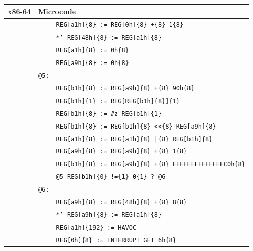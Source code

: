 \documentclass[10pt,twocolumn]{article}
\begin{document}
\begin{table}[!h]
\begin{center}
\begin{tabular}{r|rl}
\textbf{x86-64} & \multicolumn{2}{l}{\textbf{Microcode}}
\\ \hline

& & \texttt{REG[a1h]\{8\} := REG[0h]\{8\} +\{8\} 1\{8\}} \\ & %
& \texttt{*' REG[48h]\{8\} := REG[a1h]\{8\}} \\ & %
& \texttt{REG[a1h]\{8\} := 0h\{8\}} \\ & %
& \texttt{REG[a9h]\{8\} := 0h\{8\}} \\ & %
\texttt{@5:} \\ & %
& \texttt{REG[b1h]\{8\} := REG[a9h]\{8\} +\{8\} 90h\{8\}} \\ & %
& \texttt{REG[b1h]\{1\} := REG[REG[b1h]\{8\}]\{1\}} \\ & %
& \texttt{REG[b1h]\{8\} := \#z REG[b1h]\{1\}} \\ & %
& \texttt{REG[b1h]\{8\} := REG[b1h]\{8\} <<\{8\} REG[a9h]\{8\}} \\ & %
& \texttt{REG[a1h]\{8\} := REG[a1h]\{8\} |\{8\} REG[b1h]\{8\}} \\ & %
& \texttt{REG[a9h]\{8\} := REG[a9h]\{8\} +\{8\} 1\{8\}} \\ & %
& \texttt{REG[b1h]\{8\} := REG[a9h]\{8\} +\{8\} FFFFFFFFFFFFFFC0h\{8\}} \\ & %
& \texttt{@5 REG[b1h]\{0\} !=\{1\} 0\{1\} ? @6} \\ & %
\texttt{@6:} \\ & %
& \texttt{REG[a9h]\{8\} := REG[48h]\{8\} +\{8\} 8\{8\}} \\ & %
& \texttt{*' REG[a9h]\{8\} := REG[a1h]\{8\}} \\ & %
& \texttt{REG[a1h]\{192\} := HAVOC} \\ & %
& \texttt{REG[0h]\{8\} := INTERRUPT GET 6h\{8\}} \\ \hline


\end{tabular}
\end{center}
\end{table}
\end{document}
